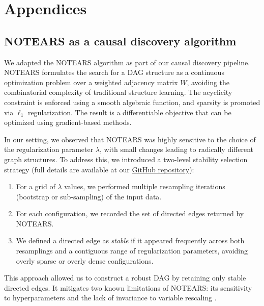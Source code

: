 \documentclass[
]{article}
\providecommand{\tightlist}{%
  \setlength{\itemsep}{0pt}\setlength{\parskip}{0pt}}\usepackage{longtable,booktabs,array}
\theoremstyle{definition}
\theoremstyle{remark}
\begin{document}
\newpage{}

\section{Appendices}\label{appendices}

\subsection{NOTEARS as a causal discovery algorithm}\label{sec-notears}

We adapted the NOTEARS algorithm  as
part of our causal discovery pipeline. NOTEARS formulates the search for
a DAG structure as a continuous optimization problem over a weighted
adjacency matrix \(W\), avoiding the combinatorial complexity of
traditional structure learning. The acyclicity constraint is enforced
using a smooth algebraic function, and sparsity is promoted via
\(\ell_1\) regularization. The result is a differentiable objective that
can be optimized using gradient-based methods.

In our setting, we observed that NOTEARS was highly sensitive to the
choice of the regularization parameter \(\lambda\), with small changes
leading to radically different graph structures. To address this, we
introduced a two-level stability selection strategy (full details are
available at our
\href{https://github.com/rmartosprieto/chloroDAG.git}{GitHub
repository}):

\begin{enumerate}
\def\labelenumi{\arabic{enumi}.}
\tightlist
\item
  For a grid of \(\lambda\) values, we performed multiple resampling
  iterations (bootstrap or sub-sampling) of the input data.
\item
  For each configuration, we recorded the set of directed edges returned
  by NOTEARS.
\item
  We defined a directed edge as \emph{stable} if it appeared frequently
  across both resamplings and a contiguous range of regularization
  parameters, avoiding overly sparse or overly dense configurations.
\end{enumerate}

This approach allowed us to construct a robust DAG by retaining only
stable directed edges. It mitigates two known limitations of NOTEARS:
its sensitivity to hyperparameters and the lack of invariance to
variable rescaling .
\end{document}
